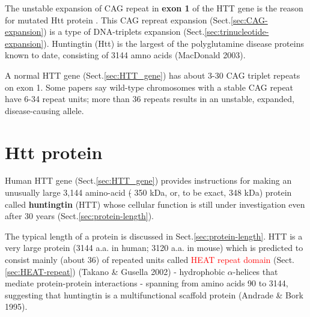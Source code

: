 The unstable expansion of CAG repeat in {\bf exon 1} of the HTT gene is the
reason for mutated Htt protein . This CAG repreat expansion
(Sect.\ref{sec:CAG-expansion}) is a type of DNA-triplets expansion
(Sect.\ref{sec:trinucleotide-expansion}).
Huntingtin (Htt) is the largest of the polyglutamine disease proteins known to
date, consisting of 3144 amno acids (MacDonald 2003).

A normal HTT gene (Sect.\ref{sec:HTT_gene}) has about 3-30 CAG triplet repeats
on exon 1. Some papers say wild-type chromosomes with a stable CAG repeat have
6-34 repeat units; more than 36 repeats results in an unstable, expanded,
disease-causing allele.




% 
% 


\section{Htt protein}
\label{sec:Htt-protein}

Human HTT gene (Sect.\ref{sec:HTT_gene}) provides instructions for making an
unusually large 3,144 amino-acid ($\tilde{}$ 350 kDa, or, to be exact, 348 kDa)
protein called {\bf huntingtin} (HTT) whose cellular function is still under
investigation even after 30 years (Sect.\ref{sec:protein-length}). 

The typical length of a protein is discussed in Sect.\ref{sec:protein-length}.
HTT is a very large protein (3144 a.a. in human; 3120 a.a. in mouse) which is
predicted to consist mainly (about 36) of repeated units called
\textcolor{red}{HEAT repeat domain} (Sect.\ref{sec:HEAT-repeat}) (Takano \&
Gusella 2002) - hydrophobic $\alpha$-helices that mediate
protein-protein interactions - spanning from amino acids 90 to 3144, suggesting
that huntingtin is a multifunctional scaffold protein (Andrade \& Bork 1995).

